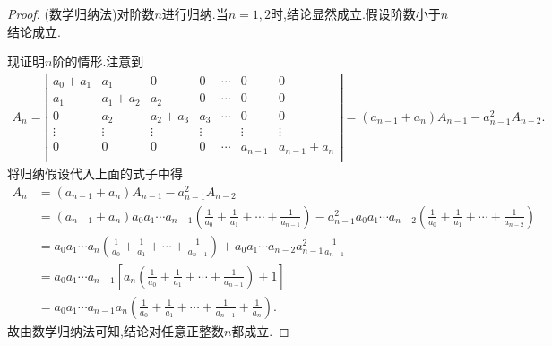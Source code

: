 \documentclass[../../main.tex]{subfiles}%
\begin{document}
    \begin{proof}
    (数学归纳法)对阶数$n$进行归纳.当$n=1,2$时,结论显然成立.假设阶数小于$n$结论成立.
    
    现证明$n$阶的情形.注意到
    \begin{align*}
    A_n=\left| \begin{matrix}
    a_0+a_1&		a_1&		0&		0&		\cdots&		0	&0\\
    a_1&		a_1+a_2&		a_2&		0&		\cdots&		0&		0\\
    0&		a_2&		a_2+a_3&		a_3&		\cdots&		0&		0\\
    \vdots&		\vdots&		\vdots&		\vdots&		&		\vdots&		\vdots\\
    0&		0&		0&		0&		\cdots&		a_{n-1}&		a_{n-1}+a_n\\
    \end{matrix} \right|=\left( a_{n-1}+a_n \right) A_{n-1}-a_{n-1}^{2}A_{n-2}.
    \nonumber
    \end{align*}
    将归纳假设代入上面的式子中得
    \begin{align*}
    A_n&=\left( a_{n-1}+a_n \right) A_{n-1}-a_{n-1}^{2}A_{n-2}
    \\
    &=\left( a_{n-1}+a_n \right) a_0a_1\cdots a_{n-1}\left( \frac{1}{a_0}+\frac{1}{a_1}+\cdots +\frac{1}{a_{n-1}} \right) -a_{n-1}^{2}a_0a_1\cdots a_{n-2}\left( \frac{1}{a_0}+\frac{1}{a_1}+\cdots +\frac{1}{a_{n-2}} \right) 
    \\
    &=a_0a_1\cdots a_n\left( \frac{1}{a_0}+\frac{1}{a_1}+\cdots +\frac{1}{a_{n-1}} \right) +a_0a_1\cdots a_{n-2}a_{n-1}^{2}\frac{1}{a_{n-1}}
    \\
    &=a_0a_1\cdots a_{n-1}\left[ a_n\left( \frac{1}{a_0}+\frac{1}{a_1}+\cdots +\frac{1}{a_{n-1}} \right) +1 \right] 
    \\
    &=a_0a_1\cdots a_{n-1}a_n\left( \frac{1}{a_0}+\frac{1}{a_1}+\cdots +\frac{1}{a_{n-1}}+\frac{1}{a_n} \right) .
    \nonumber
    \end{align*}
    故由数学归纳法可知,结论对任意正整数$n$都成立.
    \end{proof}
\end{document}

